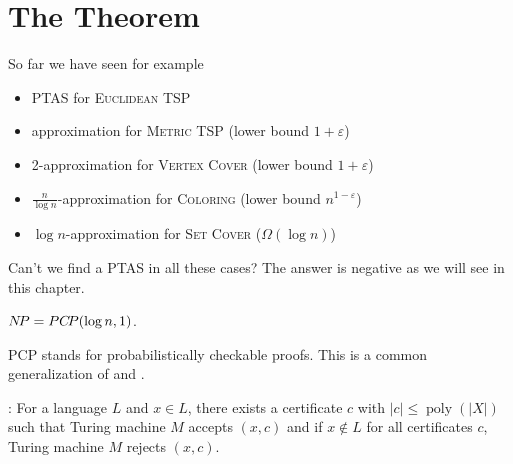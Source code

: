 \documentclass[../skript.tex]{subfiles}
\begin{document}
\chapter{The \texorpdfstring{\PCP{}}{PCP} Theorem} %
\label{sec:c7}
So far we have seen for example
\begin{itemize}
\item \ac{PTAS} for \textsc{Euclidean TSP}
\item {} approximation for \textsc{Metric TSP} (lower bound $1 + \varepsilon$)
\item 2-approximation for \textsc{Vertex Cover} (lower bound $1 + \varepsilon$)
\item $\frac{n}{\log n}$-approximation for \textsc{Coloring} (lower bound $n^{1-\varepsilon}$)
\item $\log n$-approximation for \textsc{Set Cover} ($\Omega(\log n)$)
\end{itemize}
Can't we find a PTAS in all these cases? The answer is negative as we will see in this chapter.
\begin{theorem} %
\label{thm:99}
$N \! P = PC \! P(\log n, 1)$.
\end{theorem}
PCP stands for probabilistically checkable proofs. This is a common generalization of \NP{} and \coRP{}.

\NP{}: For a language $L$ and $x \in L$, there exists a certificate $c$ with $|c| \leq \operatorname{poly}(|X|)$ such that Turing machine $M$ accepts $(x, c)$ and if $x \notin L$ for all certificates $c$, Turing machine $M$ rejects $(x, c)$.
\end{document}
